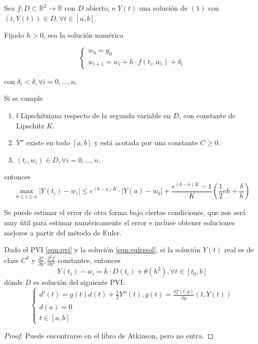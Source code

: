 \begin{theorem}
    Sea $f:D\subset \mathbb{R}^2\rightarrow \mathbb{R}$ con $D$ abierto, e $Y(t)$ una solución de $(1)$ con $(t,Y(t))\in D,\forall t\in[a,b]$.

    Fijado $h>0$, sea la solución numérica

\begin{equation}
\begin{cases}
    w_0=y_0 \\
    w_{i+1}=w_i + h\cdot f(t_i, w_i) + \delta_i
\end{cases}
\end{equation}

con $\delta_i<\delta,\forall i=0,\dots,n$.

    Si se cumple
    \begin{enumerate}[label=(\alph*)]
        \item f Lipschitziana respecto de la segunda variable en $D$, con constante de Lipschitz $K$.
        \item $Y''$ existe en todo $[a,b]$ y está acotada por una constante $C\ge 0$.
        \item $(t_i,w_i)\in D,\forall i=0,\dots,n$.
    \end{enumerate}
    entonces $$\max_{0\le i \le n}|Y(t_i)-w_i| \le e^{(b-a)K}\cdot |Y(a)-w_0| + \frac{e^{(b-a)K}-1}{K}\left(\frac{1}{2}ch+\frac{\delta}{h}\right)$$

\end{theorem}

Se puede estimar el error de otra forma bajo ciertas condiciones, que nos será muy útil para estimar numéricamente el error e incluse obtener soluciones mejores a partir del método de Euler.

\begin{theorem}
    Dado el PVI \ref{eqn:pvi} y la solución \ref{eqn:eulersol}, si la solución $Y(t)$ real es de clase $C^3$ y $\frac{\partial f}{\partial y},\frac{\partial^2f}{\partial y^2}$ constantes, entonces
    \begin{equation}
    Y(t_i)-w_i=h\cdot D(t_i)+\theta(h^2),\forall t\in[t_0,b]
    \end{equation}
    dónde $D$ es solución del siguiente PVI:
\begin{equation}
\begin{cases}
    d'(t)=g(t)d(t) + \frac{1}{2} Y''(t), g(t)=\frac{\partial f(t,y)}{\partial y}(t,Y(t)) \\
    d(a) = 0 \\
    t\in[a,b]
\end{cases}
\end{equation}
\end{theorem}
\begin{proof}
Puede encontrarse en el libro de Atkinson, pero no entra.
\end{proof}

